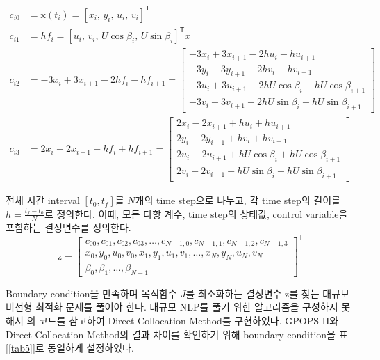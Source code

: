 \begin{equation}
	\begin{aligned}
		c_{i0} & = \mathrm{x}(t_i) = [x_i,\, y_i,\, u_i,\, v_i]^\mathsf{T}			\\
		c_{i1} & = hf_i = [u_i,\, v_i,\, U\cos\beta_i,\, U\sin\beta_i]^\mathsf{T}x	\\
		c_{i2} & = -3x_i + 3x_{i+1} - 2hf_i - hf_{i+1} = \begin{bmatrix}
		-3x_i + 3x_{i+1} - 2hu_i - hu_{i+1} 					\\
		-3y_i + 3y_{i+1} - 2hv_i - hv_{i+1} 					\\
		-3u_i + 3u_{i+1} - 2hU\cos\beta_i - hU\cos\beta_{i+1} 	\\
		-3v_i + 3v_{i+1} - 2hU\sin\beta_i - hU\sin\beta_{i+1}
		\end{bmatrix} \\
		c_{i3} & = 2x_i - 2x_{i+1} + hf_i + hf_{i+1} = \begin{bmatrix}
		2x_i - 2x_{i+1} + hu_i + hu_{i+1}                   	\\
		2y_i - 2y_{i+1} + hv_i + hv_{i+1}                   	\\
		2u_i - 2u_{i+1} + hU\cos\beta_i + hU\cos\beta_{i+1} 	\\
		2v_i - 2v_{i+1} + hU\sin\beta_i + hU\sin\beta_{i+1}
		\end{bmatrix}
	\end{aligned}
\end{equation}

전체 시간 interval $[t_0, t_f]$를 $N$개의 time step으로 나누고, 각 time step의 길이를 $h = \frac{t_f - t_0}{N}$로 정의한다.
이때, 모든 다항 계수, time step의 상태값, control variable을 포함하는 결정변수를 정의한다.
\begin{equation}\label{dirCol:eq4}
	\mathrm{z} = \begin{bmatrix}
		c_{00}, c_{01}, c_{02}, c_{03}, \ldots, c_{N-1,0}, c_{N-1,1}, c_{N-1,2}, c_{N-1,3} \\
		x_0, y_0, u_0, v_0, x_1, y_1, u_1, v_1, \ldots, x_N, y_N, u_N, v_N                 \\
		\beta_0, \beta_1, \ldots, \beta_{N-1}
	\end{bmatrix}^\mathsf{T}
\end{equation}

Boundary condition을 만족하며 목적함수 $J$를 최소화하는 결정변수 $\mathrm{z}$를 찾는 대규모 비선형 최적화 문제를 풀어야 한다.
대규모 NLP를 풀기 위한 알고리즘을 구성하지 못해서 \citep{kellyDirectCollocation}의 코드를 참고하여 Direct Collocation Method를 구현하였다.
GPOPS-II와 Direct Collocation Method의 결과 차이를 확인하기 위해 boundary condition을 표 [\ref{tab5}]로 동일하게 설정하였다.

